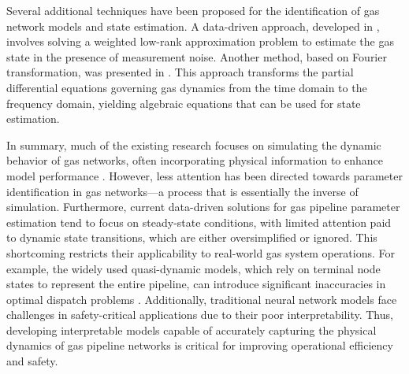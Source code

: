 Several additional techniques have been proposed for the identification of gas network models and state estimation.
A data-driven approach, developed in \cite{huangDataDrivenStateEstimation2023}, involves solving a weighted low-rank approximation problem to estimate the gas state in the presence of measurement noise. 
Another method, based on Fourier transformation, was presented in \cite{yinEnergyCircuitTheory2020}. This approach transforms the partial differential equations governing gas dynamics from the time domain to the frequency domain, yielding algebraic equations that can be used for state estimation.

In summary, much of the existing research focuses on simulating the dynamic behavior of gas networks, often incorporating physical information to enhance model performance \cite{suHybridPhysicalData2021, yinHighaccuracyOnlineTransient2023}. 
However, less attention has been directed towards parameter identification in gas networks—a process that is essentially the inverse of simulation. 
Furthermore, current data-driven solutions for gas pipeline parameter estimation tend to focus on steady-state conditions, with limited attention paid to dynamic state transitions, which are either oversimplified or ignored. 
This shortcoming restricts their applicability to real-world gas system operations. 
For example, the widely used quasi-dynamic models, which rely on terminal node states to represent the entire pipeline, can introduce significant inaccuracies in optimal dispatch problems \cite{yangEffectNaturalGas2018}. 
Additionally, traditional neural network models face challenges in safety-critical applications due to their poor interpretability. 
Thus, developing interpretable models capable of accurately capturing the physical dynamics of gas pipeline networks is critical for improving operational efficiency and safety.
